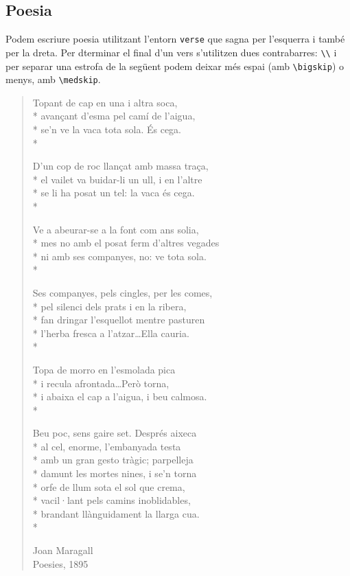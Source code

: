 \documentclass[a4paper,%
                             twoside,%
                             BCOR1.0cm,%
                             DIV11,%
                             parskip=full,%
                             11pt]{scrbook}
\begin{document}
\subsection{Poesia}\label{sbsec:poesia}

Podem escriure poesia utilitzant l'entorn \verb+verse+ que sagna per l'esquerra i també per la dreta. Per dterminar el final d'un vers s'utilitzen dues contrabarres: \verb+\\+ i per separar una estrofa de la següent podem deixar més espai (amb \verb+\bigskip+) o menys, amb  \verb+\medskip+.


\begin{verse}

Topant de cap en una i altra soca,\\*
avançant d'esma pel camí de l'aigua,\\*
se'n ve la vaca tota sola. És cega.\\*
\medskip

D'un cop de roc llançat amb massa traça,\\*
el vailet va buidar-li un ull, i en l'altre\\*
se li ha posat un tel: la vaca és cega.\\*
\medskip

Ve a abeurar-se a la font com ans solia,\\*
mes no amb el posat ferm d'altres vegades\\*
ni amb ses companyes, no: ve tota sola.\\*
\medskip

Ses companyes, pels cingles, per les comes,\\*
pel silenci dels prats i en la ribera,\\*
fan dringar l'esquellot mentre pasturen\\*
l'herba fresca a l'atzar\dots Ella cauria.\\*
\medskip

Topa de morro en l'esmolada pica\\*
i recula afrontada\dots Però torna,\\*
i abaixa el cap a l'aigua, i beu calmosa.\\*
\medskip

Beu poc, sens gaire set. Després aixeca\\*
al cel, enorme, l'embanyada testa\\*
amb un gran gesto tràgic; parpelleja\\*
damunt les mortes nines, i se'n torna\\*
orfe de llum sota el sol que crema,\\*
vacil·lant pels camins inoblidables,\\*
brandant llànguidament la llarga cua.\\*
\medskip
\begin{flushright}
Joan Maragall\\
Poesies, 1895\\
\end{flushright}
\end{verse}
\end{document}
